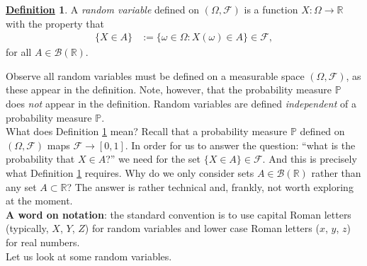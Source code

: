 \documentclass[12pt]{book}
\numberwithin{equation}{chapter}
\theoremstyle{plain}
\numberwithin{theorem}{section}
\theoremstyle{definition}
\newtheorem{definition}[theorem]{\underline{Definition}}
\newtheorem{remark}[theorem]{\underline{Remark}}
\numberwithin{exercise}{chapter}
\newcommand{\<}{\langle}
\renewcommand{\>}{\rangle}
\renewcommand{\(}{\left(}
\renewcommand{\)}{\right)}
\renewcommand{\[}{\left[}
\renewcommand{\]}{\right]}
\newcommand\Pb{\mathds{P}}
\newcommand\Rb{\mathds{R}}
\newcommand\Bc{\mathscr{B}}
\newcommand\Fc{\mathscr{F}}
\newcommand\Oc{\mathscr{O}}
\newcommand\om{\omega}
\newcommand\Om{\Omega}
\newcommand\sig{\sigma}
\begin{document}
%

\begin{definition}
\label{def:rv}
A \emph{random variable} defined on $(\Om,\Fc)$ is a function $X: \Om \to \Rb$ with the property that
\begin{align}
\{ X \in A \}
	&:=	\{ \om \in \Om : X(\om) \in A \} 
	\in \Fc , \label{eq:rv}
\end{align}
for all $A \in \Bc(\Rb)$.
\end{definition}

\noindent
Observe all random variables must be defined on a measurable space $(\Om,\Fc)$, as these appear in the definition.  Note, however, that the probability measure $\Pb$ does \emph{not} appear in the definition.  Random variables are defined \emph{independent} of a probability measure $\Pb$.
\\[0.5em]
What does Definition \ref{def:rv} mean?  Recall that a probability measure $\Pb$ defined on $(\Om,\Fc)$ maps $\Fc \to [0,1]$.  In order for us to answer the question: ``what is the probability that $X \in A$?'' we need for the set $\{ X \in A \} \in \Fc$.  And this is precisely what Definition \ref{def:rv} requires.  Why do we only consider sets $A \in \Bc(\Rb)$ rather than any set $A \subset \Rb$?  The answer is rather technical and, frankly, not worth exploring at the moment.
\\[0.5em]
\textbf{A word on notation}: the standard convention is to use capital Roman letters (typically, $X$, $Y$, $Z$) for random variables and lower case Roman letters ($x$, $y$, $z$) for real numbers.
\\[0.5em]
Let us look at some random variables.
\end{document}
